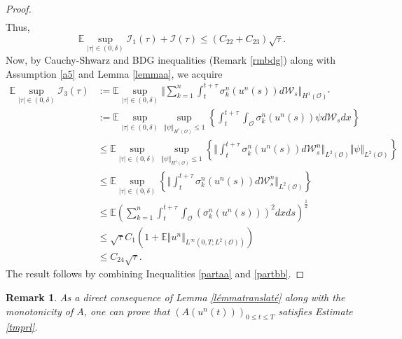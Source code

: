 \documentclass[10pt,number,preprint,times]{elsarticle}
\numberwithin{equation}{section} %
\newtheorem{rem}{Remark}[section]
\begin{document}
\begin{proof}
\begin{align}
\end{align}
Thus, 
\begin{equation}\label{partaa}
	\mathbb{E} \underset{\vert \tau \vert \in (0,\delta)}{\sup}  \mathscr{I}_1(\tau)+\mathscr{I}(\tau)  \leq (C_{22}+C_{23}) \sqrt{\tau}.
\end{equation}
Now, by Cauchy-Shwarz and BDG inequalities (Remark \ref{rmbdg}) along with Assumption \ref{a5} and  Lemma \ref{lemmaa}, we acquire
\begin{align}\label{partbb}
\mathbb{E} \underset{\vert \tau \vert \in (0,\delta)}{\sup} 	\mathscr{I}_3(\tau)&:= \mathbb{E} \underset{\vert \tau \vert \in (0,\delta)}{\sup} \bigg \Vert \sum_{k=1}^{n} \int_{t}^{t + \tau}  \sigma_{k}^n(u^n(s)) d\mathcal{W}_s \bigg \Vert _{H^1(\mathcal{O})^*}\nonumber \\
	&:=\mathbb{E} \underset{\vert \tau \vert \in (0,\delta)}{\sup}  \underset{\Vert \psi \Vert_{H^1(\mathcal{O})} \leq 1}{\sup} \left\{\int_t^{t+\tau} \int_{\mathcal{O}}  \sigma_{k}^n(u^n(s)) \psi d\mathcal{W}_s dx\right\} \nonumber\\
	&\leq \mathbb{E} \underset{\vert \tau \vert \in (0,\delta)}{\sup}  \underset{\Vert \psi \Vert_{H^1(\mathcal{O})} \leq 1}{\sup} \left\{\bigg \Vert    \int_t^{t+\tau}  \sigma_{k}^n(u^n(s)) d\mathcal{W}^n_s \bigg \Vert_{L^2(\mathcal{O})} \Vert \psi \Vert_{L^2(\mathcal{O})} \right\} \nonumber\\
	&\leq \mathbb{E} \underset{\vert \tau \vert \in (0,\delta)}{\sup}  \left\{\bigg \Vert    \int_t^{t+\tau}  \sigma_{k}^n(u^n(s)) d\mathcal{W}^n_s \bigg \Vert_{L^2(\mathcal{O})} \right\} \nonumber\\
	&\leq \mathbb{E} \left(\sum_{k=1}^n  \int_{t}^{t+\tau} \int_{\mathcal{O}} \left(\sigma_{k}^n(u^n(s))\right)^2 dx ds\right)^{\frac{1}{2}} \nonumber\\
	&\leq \sqrt{\tau} C_{1} \left(1+\mathbb{E} \Vert u^n \Vert_{L^\infty(0,T;L^2(\mathcal{O}))}\right)  \nonumber\\
	&\leq C_{24} \sqrt{\tau}.
\end{align} 
The result follows by combining Inequalities \eqref{partaa} and \eqref{partbb}.
\end{proof}
\begin{rem}
As a direct consequence of Lemma \ref{lémmatranslaté} along with the monotonicity of $A$, one can prove that $\left(A(u^n(t))\right)_{0 \leq t \leq T}$ satisfies Estimate \eqref{tmprl}. 
\end{rem}
\end{document}
